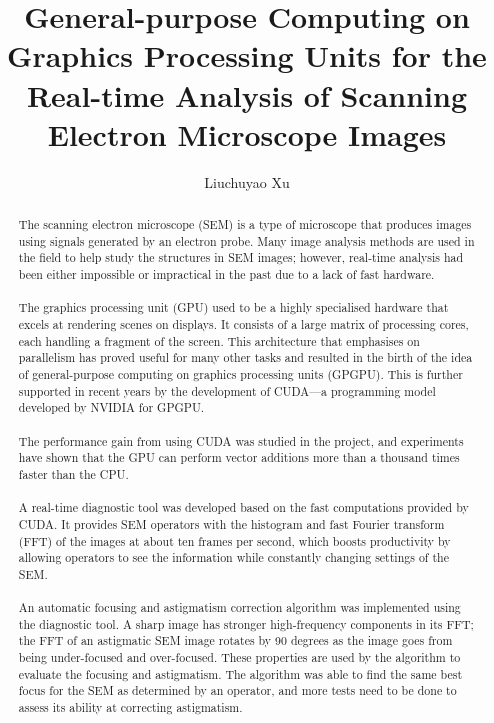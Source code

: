 \documentclass[12pt, twocolumn]{report}
\author{Liuchuyao Xu}
\title{General-purpose Computing on Graphics Processing Units for the Real-time Analysis of Scanning Electron Microscope Images}
\begin{document}
\maketitle
\tableofcontents

\begin{abstract}    
\paragraph{}
The scanning electron microscope (SEM) is a type of microscope that produces images using signals generated by an electron probe. Many image analysis methods are used in the field to help study the structures in SEM images; however, real-time analysis had been either impossible or impractical in the past due to a lack of fast hardware.

\paragraph{}
The graphics processing unit (GPU) used to be a highly specialised hardware that excels at rendering scenes on displays. It consists of a large matrix of processing cores, each handling a fragment of the screen. This architecture that emphasises on parallelism has proved useful for many other tasks and resulted in the birth of the idea of general-purpose computing on graphics processing units (GPGPU). This is further supported in recent years by the development of CUDA---a programming model developed by NVIDIA for GPGPU.

\paragraph{}
The performance gain from using CUDA was studied in the project, and experiments have shown that the GPU can perform vector additions more than a thousand times faster than the CPU.

\paragraph{}
A real-time diagnostic tool was developed based on the fast computations provided by CUDA. It provides SEM operators with the histogram and fast Fourier transform (FFT) of the images at about ten frames per second, which boosts productivity by allowing operators to see the information while constantly changing settings of the SEM.

\paragraph{}
An automatic focusing and astigmatism correction algorithm was implemented using the diagnostic tool. A sharp image has stronger high-frequency components in its FFT; the FFT of an astigmatic SEM image rotates by 90 degrees as the image goes from being under-focused and over-focused. These properties are used by the algorithm to evaluate the focusing and astigmatism. The algorithm was able to find the same best focus for the SEM as determined by an operator, and more tests need to be done to assess its ability at correcting astigmatism.
\end{abstract}
\end{document}
